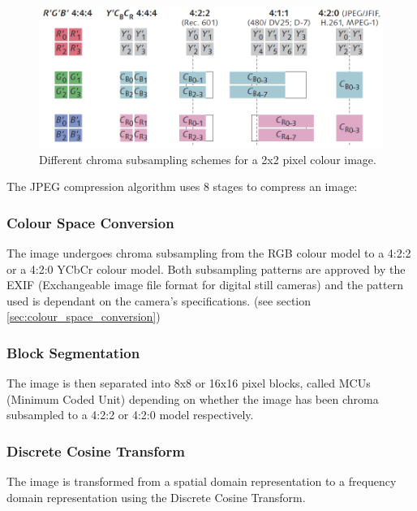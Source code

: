 \begin{figure}[!hbtp]
\begin{center}
\includegraphics[scale=0.5]{figures/chromasub.png} 
\end{center}
\caption{Different chroma subsampling schemes for a 2x2 pixel colour image.\label{chroma_examples}\cite{poynton_chroma_subsampling}}
\end{figure}


The JPEG compression algorithm uses 8 
stages to compress an image: \cite{hass_impulse_jpeg}

\subsubsection{Colour Space Conversion}
The image undergoes chroma subsampling from the 
RGB colour model to a 4:2:2 or a 4:2:0 YCbCr colour model. 
Both subsampling patterns are approved by the
EXIF (Exchangeable image file format for digital still cameras)
and the pattern used is dependant on the camera's specifications. 
(see section \ref{sec:colour_space_conversion})

\subsubsection{Block Segmentation}
The image is then separated into 8x8 or 16x16 pixel blocks,
called MCUs (Minimum Coded Unit) 
depending on whether the image has been chroma
subsampled to a 4:2:2 or 4:2:0 model respectively. \cite{exif_std}

\subsubsection{Discrete Cosine Transform}
The image is transformed from a spatial domain 
representation to a frequency domain representation
using the Discrete Cosine Transform. \cite{hass_impulse_jpeg}

